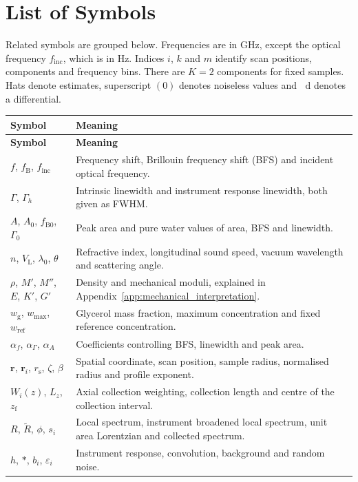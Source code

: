 \documentclass[11pt]{article}
\newcommand{\wg}{w_{\mathrm g}}
\newcommand{\wmax}{w_{\max}}
\newcommand{\dd}{\mathop{}\!\mathrm{d}}
\begin{document}
\section*{List of Symbols}
{}
Related symbols are grouped below. Frequencies are in GHz, except the optical frequency $f_{\mathrm{inc}}$, which is in Hz. Indices $i$, $k$ and $m$ identify scan positions, components and frequency bins. There are $K=2$ components for fixed samples. Hats denote estimates, superscript $(0)$ denotes noiseless values and $\dd$ denotes a differential.
\small
\begin{longtable}{@{}p{}p{}@{}}
\toprule \textbf{Symbol} & \textbf{Meaning} \\ \midrule\endfirsthead
\toprule \textbf{Symbol} & \textbf{Meaning} \\ \midrule\endhead
$f$, $f_{\mathrm B}$, $f_{\mathrm{inc}}$ & Frequency shift, Brillouin frequency shift (BFS) and incident optical frequency. \\
$\Gamma$, $\Gamma_h$ & Intrinsic linewidth and instrument response linewidth, both given as FWHM. \\
$A$, $A_0$, $f_{\mathrm{B0}}$, $\Gamma_0$ & Peak area and pure water values of area, BFS and linewidth. \\
$n$, $V_{\mathrm L}$, $\lambda_0$, $\theta$ & Refractive index, longitudinal sound speed, vacuum wavelength and scattering angle. \\
$\rho$, $M'$, $M''$, $E$, $K'$, $G'$ & Density and mechanical moduli, explained in Appendix~\ref{app:mechanical_interpretation}. \\
$\wg$, $\wmax$, $w_{\mathrm{ref}}$ & Glycerol mass fraction, maximum concentration and fixed reference concentration. \\
$\alpha_f$, $\alpha_\Gamma$, $\alpha_A$ & Coefficients controlling BFS, linewidth and peak area. \\
$\mathbf r$, $\mathbf r_i$, $r_{\mathrm s}$, $\zeta$, $\beta$ & Spatial coordinate, scan position, sample radius, normalised radius and profile exponent. \\
$W_i(z)$, $L_z$, $z_{\mathrm f}$ & Axial collection weighting, collection length and centre of the collection interval. \\
$R$, $\widetilde R$, $\phi$, $s_i$ & Local spectrum, instrument broadened local spectrum, unit area Lorentzian and collected spectrum. \\
$h$, $*$, $b_i$, $\varepsilon_i$ & Instrument response, convolution, background and random noise. \\

\end{longtable}
\end{document}
